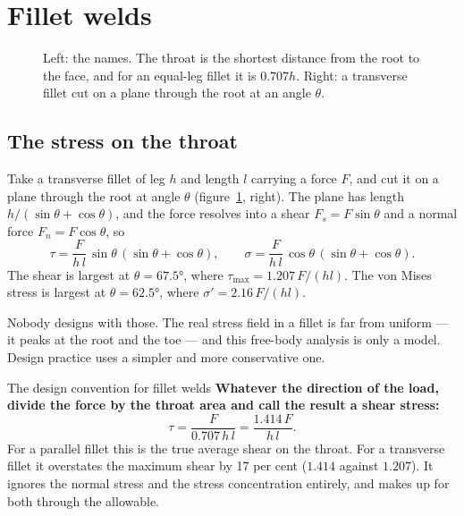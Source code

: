 \documentclass[11pt,a4paper]{article}
\begin{document}
\section{Fillet welds}
\label{sec:fillet}

\begin{figure}[H]\centering
\resizebox{0.95\textwidth}{!}{}
\caption{Left: the names. The throat is the shortest distance from the root to the face, and for
an equal-leg fillet it is $0.707h$. Right: a transverse fillet cut on a plane through the root at
an angle $\theta$.}
\label{fig:fillet}
\end{figure}

\subsection{The stress on the throat}

Take a transverse fillet of leg $h$ and length $l$ carrying a force $F$, and cut it on a plane
through the root at angle $\theta$ (figure~\ref{fig:fillet}, right). The plane has length
$h/(\sin\theta+\cos\theta)$, and the force resolves into a shear $F_s=F\sin\theta$ and a normal
force $F_n=F\cos\theta$, so
\begin{equation}
\tau=\frac{F}{h\,l}\,\sin\theta\,(\sin\theta+\cos\theta),\qquad
\sigma=\frac{F}{h\,l}\,\cos\theta\,(\sin\theta+\cos\theta).
\end{equation}
The shear is largest at $\theta=\ang{67.5}$, where $\tau_{\max}=1.207\,F/(hl)$. The von Mises
stress is largest at $\theta=\ang{62.5}$, where $\sigma'=2.16\,F/(hl)$.

\medskip
Nobody designs with those. The real stress field in a fillet is far from uniform --- it peaks at
the root and the toe --- and this free-body analysis is only a model. Design practice uses a
simpler and more conservative one.

\begin{keybox}{The design convention for fillet welds}
\textbf{Whatever the direction of the load, divide the force by the throat area and call the
result a shear stress:}
\begin{equation}
\tau=\frac{F}{0.707\,h\,l}=\frac{1.414\,F}{h\,l}.
\label{eq:fillet}
\end{equation}
For a parallel fillet this is the true average shear on the throat. For a transverse fillet it
overstates the maximum shear by 17 per cent ($1.414$ against $1.207$). It ignores the normal
stress and the stress concentration entirely, and makes up for both through the allowable.
\end{keybox}
\end{document}
